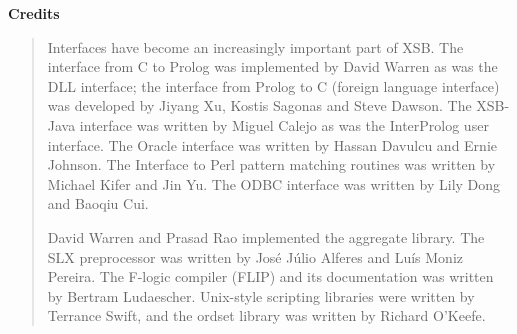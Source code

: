 
\begin{center}
{\bf {\Large 
		Credits
}}
\end{center}


\begin{quote}
Interfaces have become an increasingly important part of XSB.  The
interface from C to Prolog was implemented by David Warren as was the
DLL interface; the interface from Prolog to C (foreign language
interface) was developed by Jiyang Xu, Kostis Sagonas and Steve
Dawson.  The XSB-Java interface was written by Miguel Calejo as was
the InterProlog user interface.  The Oracle interface was written by
Hassan Davulcu and Ernie Johnson.  The Interface to Perl pattern
matching routines was written by Michael Kifer and Jin Yu.  The ODBC
interface was written by Lily Dong and Baoqiu Cui.

David Warren and Prasad Rao implemented the aggregate library.  The SLX
preprocessor was written by Jos\'e J\'ulio Alferes and Lu\'is Moniz
Pereira.  The F-logic compiler (FLIP) and its documentation was written by
Bertram Ludaescher.  Unix-style scripting libraries were written by
Terrance Swift, and the ordset library was written by Richard O'Keefe.
\end{quote}

